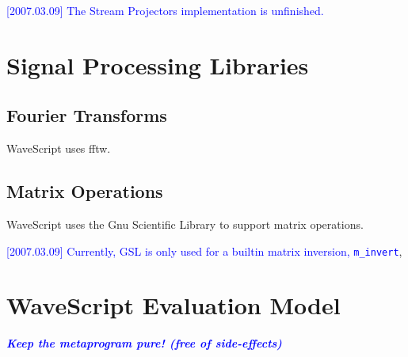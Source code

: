 \documentclass[twocolumn]{report}
\newcommand{\rednote}[1]{{\textcolor{blue}{#1}}}
\begin{document}
\rednote{[2007.03.09] The Stream Projectors implementation is unfinished.}

\chapter{Signal Processing Libraries}

\section{Fourier Transforms}

WaveScript uses fftw.

\section{Matrix Operations}

WaveScript uses the Gnu Scientific Library to support matrix operations.

\rednote{[2007.03.09] Currently, GSL is only used for a builtin matrix
  inversion, {\tt m\_invert}}, 

\chapter{WaveScript Evaluation Model}

\rednote{\em \bf Keep the metaprogram pure! (free of side-effects)}
\end{document}
